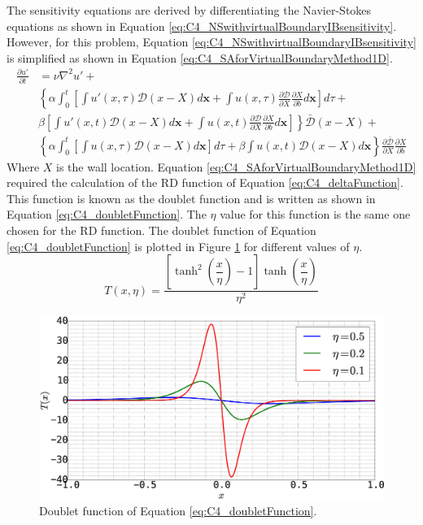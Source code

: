 The sensitivity equations are derived by differentiating the Navier-Stokes equations as shown in Equation \eqref{eq:C4_NSwithvirtualBoundaryIBsensitivity}. However, for this problem, Equation \eqref{eq:C4_NSwithvirtualBoundaryIBsensitivity} is simplified as shown in Equation \eqref{eq:C4_SAforVirtualBoundaryMethod1D}.
%
\begin{align}\label{eq:C4_SAforVirtualBoundaryMethod1D}
    \frac{\partial u'}{\partial t}
    &= 
    \nu \nabla^2 u' + \nonumber \\
    &\left\{
    \alpha
    \int_0^t
    \left[
        \int u'(x, \tau) \mathcal{D}(x - X) d\mathbf{x} + 
        \int u(x, \tau) \frac{\partial \mathcal{D}}{\partial X} \frac{\partial X}{\partial b} d\mathbf{x}
    \right] d\tau \right.
    + \nonumber \\
    &
    \left.
    \beta
    \left[
    \int u'(x, t) \mathcal{D}(x - X) d\mathbf{x} +
    \int u(x, t) \frac{\partial \mathcal{D}}{\partial X} \frac{\partial X}{\partial b} d\mathbf{x}
    \right]
    \right\} \bar{\mathcal{D}}(x - X) + \nonumber \\
    &\left\{
    \alpha
    \int_0^t
    \left[
        \int u(x, \tau) \mathcal{D}(x - X) d\mathbf{x}
    \right] d\tau
    +
    \beta
    \int u(x, t) \mathcal{D}(x - X) d\mathbf{x}
    \right\}
    \frac{\partial \bar{\mathcal{D}}}{\partial X} \frac{\partial X}{\partial b}
\end{align}
%
Where $X$ is the wall location. Equation \eqref{eq:C4_SAforVirtualBoundaryMethod1D} required the calculation of the RD function of Equation \eqref{eq:C4_deltaFunction}. This function is known as the doublet function \cite{kamaraju2009linear} and is written as shown in Equation \eqref{eq:C4_doubletFunction}. The $\eta$ value for this function is the same one chosen for the RD function. The doublet function of Equation \eqref{eq:C4_doubletFunction} is plotted in Figure \ref{fig:C4_doubletFunction} for different values of $\eta$.
%
\begin{equation}\label{eq:C4_doubletFunction}
    T(x, \eta) = 
    \frac{\left[ \tanh^{2}{\left(\dfrac{x}{\eta} \right)} - 1 \right] \tanh{\left( \dfrac{x}{\eta} \right)}}{\eta^2} 
\end{equation}
%
%
\begin{figure}[H]
    \centering
    \includegraphics[width=12.00cm]{Chapter_4/figure/doubletFunction.eps}
    \caption{Doublet function of Equation \eqref{eq:C4_doubletFunction}.}
    \label{fig:C4_doubletFunction}
\end{figure}

